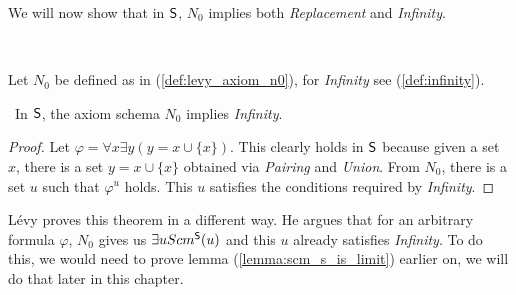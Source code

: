 We will now show that in $\sf{S}$, $N_0$ implies both \emph{Replacement} and \emph{Infinity}.

\

Let $N_0$ be defined as in (\ref{def:levy_axiom_n0}), for \emph{Infinity} see (\ref{def:infinity}).
\begin{theorem}\label{theorem:n0_implies_infinity}\
In $\sf{S}$, the axiom schema $N_0$ implies \emph{Infinity}.
\end{theorem}

\begin{proof} %
Let $\varphi = \forall x \exists y (y = x \cup \{x\})$. 
This clearly holds in $\sf{S}$ because given a set~$x$, there is a set $y = x \cup \{x\}$ obtained via \emph{Pairing} and \emph{Union}. %
From $N_0$, there is a set $u$ such that $\varphi^{u}$ holds. %
 This $u$ satisfies the conditions required by \emph{Infinity}.
\end{proof}

Lévy proves this theorem in a different way. He argues that for an arbitrary formula $\varphi$, $N_0$ gives us $\exists u Scm^{\sf{S}}(u)$ and this $u$ already satisfies \emph{Infinity}. 
To do this, we would need to prove lemma (\ref{lemma:scm_s_is_limit}) earlier on, we will do that later in this chapter.

\

